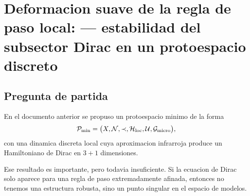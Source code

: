 \chapter{Deformacion suave de la regla de paso local: --- estabilidad del subsector Dirac en un protoespacio discreto}
\label{ch:deformacion-regla-paso}







\begin{abstract}
Una vez propuesto un modelo minimo de protoespacio discreto con subsector Dirac en el infrarrojo, la pregunta decisiva ya no es solo \enquote{si aparece Dirac}, sino \enquote{si Dirac sobrevive cuando la regla microscopia deja de ser perfectamente regular}. Este documento estudia deformaciones suaves de la regla de paso local. La idea central es distinguir tres situaciones: deformaciones que solo renormalizan velocidades y preservan un sector tipo Dirac; deformaciones que conservan la linealidad pero introducen anisotropia o fondos efectivos; y deformaciones que destruyen el nodo relativista abriendo gap o desplazando el minimo. El resultado conceptual es que el protoespacio no debe identificarse con una configuracion rigidamente cartesiana, sino con una clase de dinamicas locales cuya fisica infrarroja puede mantenerse relativista de forma robusta.
\end{abstract}

\section{Pregunta de partida}
En el documento anterior se propuso un protoespacio minimo de la forma
\begin{equation}
\mathcal P_{\mathrm{min}}
=
\bigl(X,\mathcal N,\prec,\mathcal{H}_{\mathrm{loc}},\mathcal U,\mathcal G_{\mathrm{micro}}\bigr),
\end{equation}
con una dinamica discreta local cuya aproximacion infrarroja produce un Hamiltoniano de Dirac en \(3+1\) dimensiones.

Ese resultado es importante, pero todavia insuficiente. Si la ecuacion de Dirac solo aparece para una regla de paso extremadamente afinada, entonces no tenemos una estructura robusta, sino un punto singular en el espacio de modelos.

